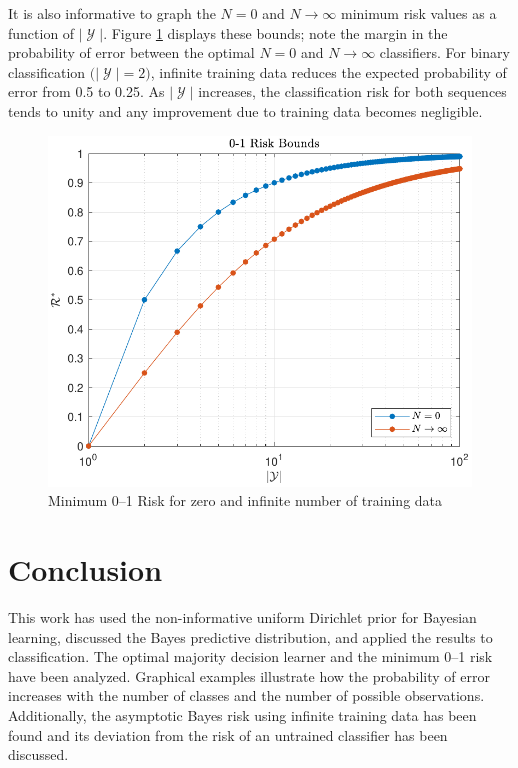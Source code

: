 \documentclass[conference]{IEEEtran}
\DeclareMathOperator{\Ycal}{\mathcal{Y}}
\begin{document}
It is also informative to graph the $N=0$ and $N \to \infty$ minimum risk values as a function of $|\Ycal|$. Figure \ref{fig:Risk_01_uni_N_bounds} displays these bounds; note the margin in the probability of error between the optimal $N=0$ and $N \to \infty$ classifiers. For binary classification $\big( |\Ycal| = 2 \big)$, infinite training data reduces the expected probability of error from 0.5 to 0.25. As $|\Ycal|$ increases, the classification risk for both sequences tends to unity and any improvement due to training data becomes negligible.

\begin{figure}
\centering
\includegraphics[width=0.9\linewidth]{Risk_01_uni_N_bounds.pdf}
\caption{Minimum 0--1 Risk for zero and infinite number of training data}
\label{fig:Risk_01_uni_N_bounds}
\end{figure}






\section{Conclusion}

This work has used the non-informative uniform Dirichlet prior for Bayesian learning, discussed the Bayes predictive distribution, and applied the results to classification. The optimal majority decision learner and the minimum 0--1 risk have been analyzed. Graphical examples illustrate how the probability of error increases with the number of classes and the number of possible observations. Additionally, the asymptotic Bayes risk using infinite training data has been found and its deviation from the risk of an untrained classifier has been discussed. 
\end{document}

